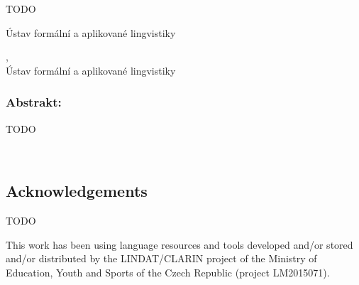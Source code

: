 \documentclass[12pt,notitlepage,a4paper,openright]{report}
\begin{document}
\cleardoublepage{}
\begin{description}[leftmargin=7.5em,labelwidth=7em,labelindent=0em,labelsep=0.5em]
  \item[Název práce:] TODO
  \item[Autor:] \theauthor{}
  \item[Katedra:] Ústav formální a aplikované lingvistiky
  \item[Vedoucí práce:] \thesupervisor,\\ Ústav formální a aplikované lingvistiky
\end{description}

\subsubsection{Abstrakt:}



\begin{description}[leftmargin=7.5em,labelwidth=7em,labelindent=0em,labelsep=0.5em]
  \item[Klíčová slova:] TODO
\end{description}





\cleardoublepage{}
\ \vspace{10mm}

\subsection*{Acknowledgements}

{

  TODO


}

\vfill


{\noindent\footnotesize %
  This work has been using language resources and tools developed and/or stored and/or distributed by the  LINDAT/CLARIN project of the Ministry of Education, Youth and Sports of the Czech Republic (project LM2015071).
}
\end{document}
